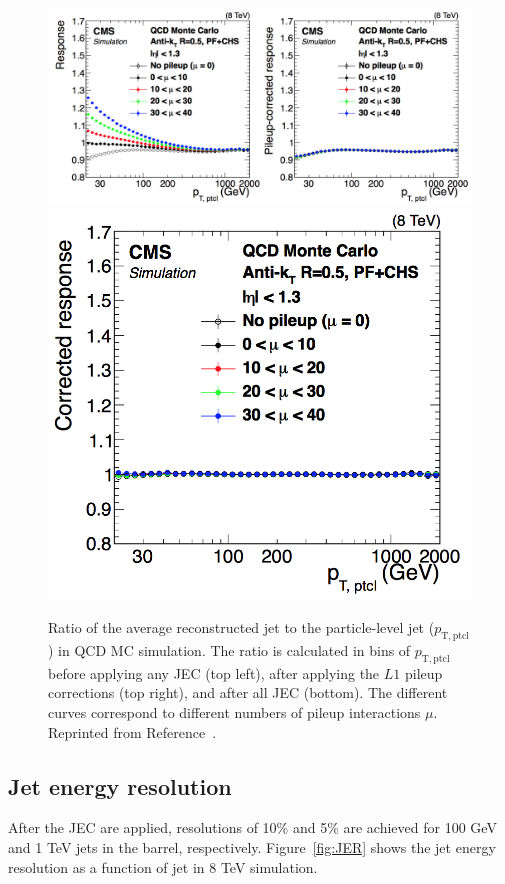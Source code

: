  \begin{figure}[h!]
	\centering
	\includegraphics[width=1.0\linewidth]{Figures/EventReconstruction/JEC1.png}
	\includegraphics[width=0.5\linewidth]{Figures/EventReconstruction/JEC2.png}
       \caption{Ratio of the average reconstructed jet \pt to the particle-level jet \pt ($p_{\mathrm{T,ptcl}}$) in QCD MC simulation.
       The ratio is calculated in bins of $p_{\mathrm{T,ptcl}}$ before applying any JEC (top left), after applying the $L1$ pileup corrections
       (top right), and after all JEC (bottom). The different curves correspond to different numbers of pileup interactions $\mu$.
       Reprinted from Reference~\cite{JEC}.}
       \label{fig:JEC}
\end{figure}

\subsection{Jet energy resolution}
\label{sec:JER}

After the JEC are applied, resolutions of 10\% and 5\% are achieved for 100 GeV and 1 TeV jets in the barrel, respectively. Figure~\ref{fig:JER} shows the jet energy resolution as a function of jet \pt in 8 TeV simulation. 

